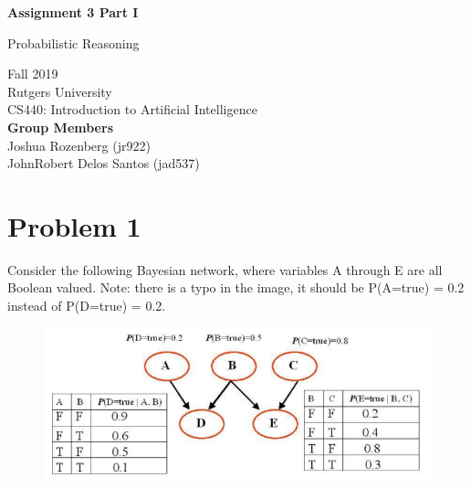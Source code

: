 \documentclass{article}
\begin{document}
\begin{titlepage}
    \begin{center}
        \vspace*{1cm}
 
        \Huge
        \textbf{Assignment 3 Part I}
 
        \vspace{0.5cm}
        \LARGE
        Probabilistic Reasoning
 
        \vspace{1.5cm}
 
        \vspace{0.8cm}
  
        \Large
        Fall 2019\\
        Rutgers University\\
        CS440: Introduction to Artificial Intelligence\\
       	
       	\vspace{2cm}
        \large
        \textbf{Group Members} \\
        Joshua Rozenberg (jr922)\\
        JohnRobert Delos Santos (jad537)\\
   
    \end{center}
\end{titlepage}

\newpage
{}

\section{Problem 1}
Consider the following Bayesian network, where variables A through E are all Boolean valued. Note: there is a typo in the image, it should be P(A=true) = 0.2 instead of P(D=true) = 0.2.
\begin{figure}[H]
\centering
\includegraphics{images/1.png}
\end{figure}
\end{document}
